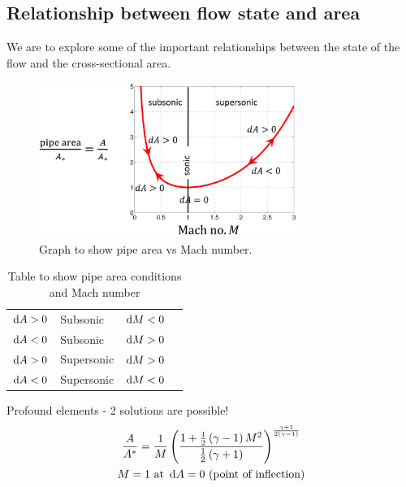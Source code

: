 \documentclass[class=report, crop=false, 12pt,a4paper]{standalone}
\begin{document}
\subsection{Relationship between flow state and area}
We are to explore some of the important relationships between the state of the flow and the cross-sectional area.
\begin{figure}[H]
    \centering
    \includegraphics[width = 0.75\textwidth]{../img/diagram52.png}
    \caption{Graph to show pipe area vs Mach number.}
\end{figure}
\begin{table}[H]
    \centering
    \begin{tabular}{@{}llll@{}}
        \toprule
        $\dif A > 0$ & Subsonic   & $\dif M < 0$ & \\
        $\dif A < 0$ & Subsonic   & $\dif M > 0$ & \\
        $\dif A > 0$ & Supersonic & $\dif M > 0$ & \\
        $\dif A < 0$ & Supersonic & $\dif M < 0$ & \\ \bottomrule
    \end{tabular}
    \caption{Table to show pipe area conditions and Mach number}
\end{table}
Profound elements - 2 solutions are possible!
\begin{gather}
    \frac{A}{A^*} = \frac{1}{M}\left(\frac{1+\frac{1}{2}\left(\gamma - 1\right)M^2}{\frac{1}{2}\left(\gamma + 1\right)}\right)^{\frac{\gamma + 1}{2\left(\gamma - 1\right)}}\\
    M = 1 \textrm{ at } \dif A = 0 \textrm{ (point of inflection)}
\end{gather}
\end{document}
